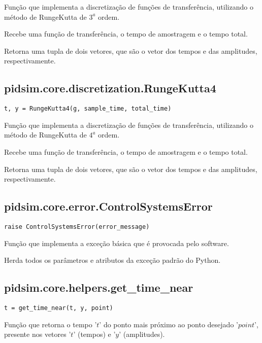     Função que implementa a discretização de funções de transferência,
    utilizando o método de RungeKutta de $3^a$ ordem.
    
    Recebe uma função de transferência, o tempo de amostragem e o tempo
    total.
    
    Retorna uma tupla de dois vetores, que são o vetor dos tempos e das amplitudes,
    respectivamente.

\subsection{pidsim.core.discretization.RungeKutta4}

    \begin{verbatim}
t, y = RungeKutta4(g, sample_time, total_time)\end{verbatim}
    
    Função que implementa a discretização de funções de transferência,
    utilizando o método de RungeKutta de $4^a$ ordem.
    
    Recebe uma função de transferência, o tempo de amostragem e o tempo
    total.
    
    Retorna uma tupla de dois vetores, que são o vetor dos tempos e das amplitudes,
    respectivamente.

\subsection{pidsim.core.error.ControlSystemsError}

    \begin{verbatim}
raise ControlSystemsError(error_message)\end{verbatim}
    
    Função que implementa a exceção básica que é provocada pelo software.
    
    Herda todos os parâmetros e atributos da exceção padrão do Python.

\subsection{pidsim.core.helpers.get\_time\_near}

    \begin{verbatim}
t = get_time_near(t, y, point)\end{verbatim}
    
    Função que retorna o tempo '$t$' do ponto mais próximo ao ponto
    desejado '$point$', presente nos vetores '$t$' (tempos) e '$y$'
    (amplitudes).
    

